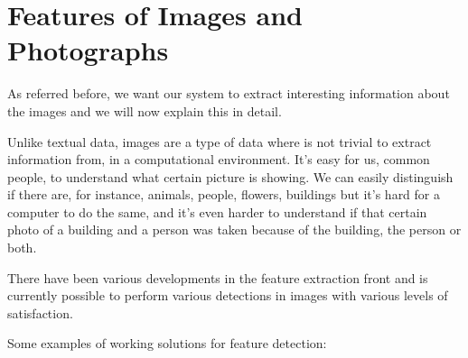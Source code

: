 



\section{Features of Images and Photographs}
\label{reqs:features}

As referred before, we want our system to extract interesting information about the images and we will now explain this in detail.


Unlike textual data, images are a type of data where is not trivial to extract information from, in a computational environment. It's easy for us, common people, to understand what certain picture is showing. We can easily distinguish if there are, for instance, animals, people, flowers, buildings but it's hard for a computer to do the same, and it's even harder to understand if that certain photo of a building and a person was taken because of the building, the person or both.

There have been various developments in the feature extraction front \cite{Liu:2007p3740,Datta:2005p3749,Rui:1999p949} and is currently possible to perform various detections in images with various levels of satisfaction.

Some examples of working solutions for feature detection:

